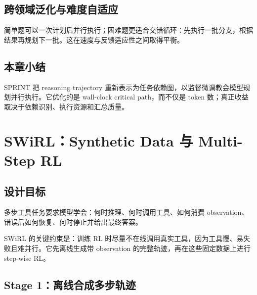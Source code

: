 \documentclass[a4paper]{article}
\begin{document}
\subsection{跨领域泛化与难度自适应}



简单题可以一次计划后并行执行；困难题更适合交错循环：先执行一批分支，根据结果再规划下一批。这在速度与反馈适应性之间取得平衡。


\subsection{本章小结}

SPRINT 把 reasoning trajectory 重新表示为任务依赖图，以监督微调教会模型规划并行执行。它优化的是 wall-clock critical path，而不仅是 token 数；真正收益取决于依赖识别、执行资源和汇总质量。

\section{SWiRL：Synthetic Data 与 Multi-Step RL}

\subsection{设计目标}

多步工具任务要求模型学会：何时推理、何时调用工具、如何消费 observation、错误后如何恢复、何时停止并给出最终答案。



SWiRL 的关键约束是：训练 RL 时尽量不在线调用真实工具，因为工具慢、易失败且难并行。它先离线生成带 observation 的完整轨迹，再在这些固定数据上进行 step-wise RL。

\subsection{Stage 1：离线合成多步轨迹}
\end{document}
